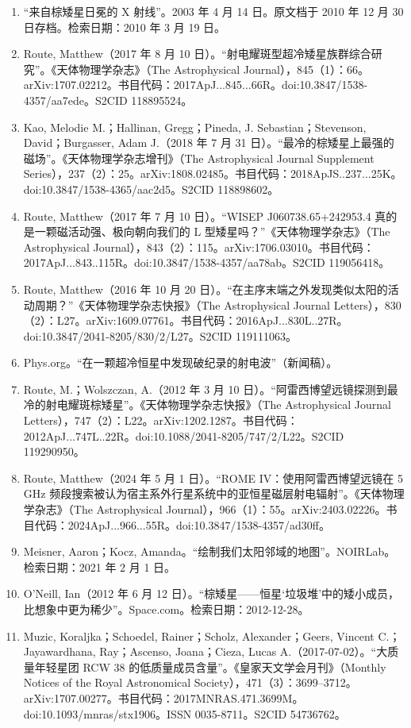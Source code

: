\begin{enumerate}
\item “来自棕矮星日冕的 X 射线”。2003 年 4 月 14 日。原文档于 2010 年 12 月 30 日存档。检索日期：2010 年 3 月 19 日。
\item Route, Matthew（2017 年 8 月 10 日）。“射电耀斑型超冷矮星族群综合研究”。《天体物理学杂志》（The Astrophysical Journal），845（1）：66。arXiv:1707.02212。书目代码：2017ApJ...845...66R。doi:10.3847/1538-4357/aa7ede。S2CID 118895524。
\item Kao, Melodie M.；Hallinan, Gregg；Pineda, J. Sebastian；Stevenson, David；Burgasser, Adam J.（2018 年 7 月 31 日）。“最冷的棕矮星上最强的磁场”。《天体物理学杂志增刊》（The Astrophysical Journal Supplement Series），237（2）：25。arXiv:1808.02485。书目代码：2018ApJS..237...25K。doi:10.3847/1538-4365/aac2d5。S2CID 118898602。
\item Route, Matthew（2017 年 7 月 10 日）。“WISEP J060738.65+242953.4 真的是一颗磁活动强、极向朝向我们的 L 型矮星吗？”《天体物理学杂志》（The Astrophysical Journal），843（2）：115。arXiv:1706.03010。书目代码：2017ApJ...843..115R。doi:10.3847/1538-4357/aa78ab。S2CID 119056418。
\item Route, Matthew（2016 年 10 月 20 日）。“在主序末端之外发现类似太阳的活动周期？”《天体物理学杂志快报》（The Astrophysical Journal Letters），830（2）：L27。arXiv:1609.07761。书目代码：2016ApJ...830L..27R。doi:10.3847/2041-8205/830/2/L27。S2CID 119111063。
\item Phys.org。“在一颗超冷恒星中发现破纪录的射电波”（新闻稿）。
\item Route, M.；Wolszczan, A.（2012 年 3 月 10 日）。“阿雷西博望远镜探测到最冷的射电耀斑棕矮星”。《天体物理学杂志快报》（The Astrophysical Journal Letters），747（2）：L22。arXiv:1202.1287。书目代码：2012ApJ...747L..22R。doi:10.1088/2041-8205/747/2/L22。S2CID 119290950。
\item Route, Matthew（2024 年 5 月 1 日）。“ROME IV：使用阿雷西博望远镜在 5 GHz 频段搜索被认为宿主系外行星系统中的亚恒星磁层射电辐射”。《天体物理学杂志》（The Astrophysical Journal），966（1）：55。arXiv:2403.02226。书目代码：2024ApJ...966...55R。doi:10.3847/1538-4357/ad30ff。
\item Meisner, Aaron；Kocz, Amanda。“绘制我们太阳邻域的地图”。NOIRLab。检索日期：2021 年 2 月 1 日。
\item O’Neill, Ian（2012 年 6 月 12 日）。“棕矮星——恒星‘垃圾堆’中的矮小成员，比想象中更为稀少”。Space.com。检索日期：2012-12-28。
\item Muzic, Koraljka；Schoedel, Rainer；Scholz, Alexander；Geers, Vincent C.；Jayawardhana, Ray；Ascenso, Joana；Cieza, Lucas A.（2017-07-02）。“大质量年轻星团 RCW 38 的低质量成员含量”。《皇家天文学会月刊》（Monthly Notices of the Royal Astronomical Society），471（3）：3699–3712。arXiv:1707.00277。书目代码：2017MNRAS.471.3699M。doi:10.1093/mnras/stx1906。ISSN 0035-8711。S2CID 54736762。

\end{enumerate}

